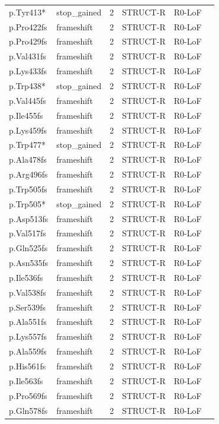 \begin{footnotesize}
\begin{longtable}{llllll}
p.Tyr413* & stop\_gained & 2 & STRUCT-R & R0-LoF & \\
p.Pro422fs & frameshift & 2 & STRUCT-R & R0-LoF & \\
p.Pro429fs & frameshift & 2 & STRUCT-R & R0-LoF & \\
p.Val431fs & frameshift & 2 & STRUCT-R & R0-LoF & \\
p.Lys433fs & frameshift & 2 & STRUCT-R & R0-LoF & \\
p.Trp438* & stop\_gained & 2 & STRUCT-R & R0-LoF & \\
p.Val445fs & frameshift & 2 & STRUCT-R & R0-LoF & \\
p.Ile455fs & frameshift & 2 & STRUCT-R & R0-LoF & \\
p.Lys459fs & frameshift & 2 & STRUCT-R & R0-LoF & \\
p.Trp477* & stop\_gained & 2 & STRUCT-R & R0-LoF & \\
p.Ala478fs & frameshift & 2 & STRUCT-R & R0-LoF & \\
p.Arg496fs & frameshift & 2 & STRUCT-R & R0-LoF & \\
p.Trp505fs & frameshift & 2 & STRUCT-R & R0-LoF & \\
p.Trp505* & stop\_gained & 2 & STRUCT-R & R0-LoF & \\
p.Asp513fs & frameshift & 2 & STRUCT-R & R0-LoF & \\
p.Val517fs & frameshift & 2 & STRUCT-R & R0-LoF & \\
p.Gln525fs & frameshift & 2 & STRUCT-R & R0-LoF & \\
p.Asn535fs & frameshift & 2 & STRUCT-R & R0-LoF & \\
p.Ile536fs & frameshift & 2 & STRUCT-R & R0-LoF & \\
p.Val538fs & frameshift & 2 & STRUCT-R & R0-LoF & \\
p.Ser539fs & frameshift & 2 & STRUCT-R & R0-LoF & \\
p.Ala551fs & frameshift & 2 & STRUCT-R & R0-LoF & \\
p.Lys557fs & frameshift & 2 & STRUCT-R & R0-LoF & \\
p.Ala559fs & frameshift & 2 & STRUCT-R & R0-LoF & \\
p.His561fs & frameshift & 2 & STRUCT-R & R0-LoF & \\
p.Ile563fs & frameshift & 2 & STRUCT-R & R0-LoF & \\
p.Pro569fs & frameshift & 2 & STRUCT-R & R0-LoF & \\
p.Gln578fs & frameshift & 2 & STRUCT-R & R0-LoF & \\

\end{longtable}
\end{footnotesize}
